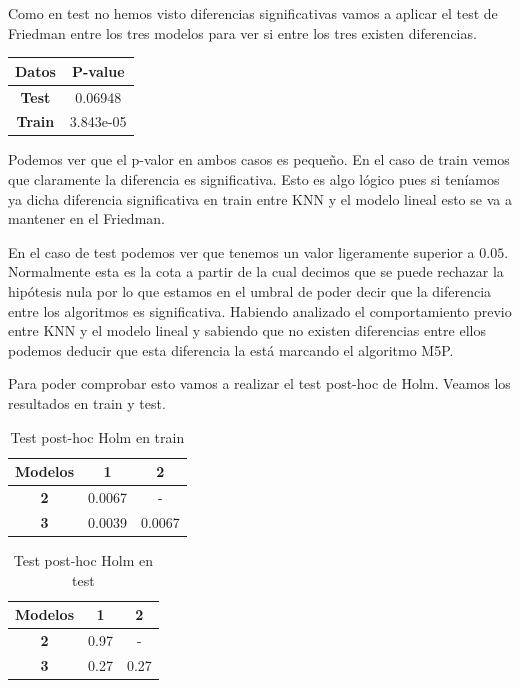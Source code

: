 \documentclass[12pt,a4paper]{article}
\begin{document}
Como en test no hemos visto diferencias significativas vamos a aplicar el test de Friedman entre los tres modelos para ver si entre los tres existen diferencias.

\begin{table}[H]
	\centering
	\begin{tabular}{|c|c|}
		\hline
		\textbf{Datos} & \textbf{P-value} \\ \hline
		\textbf{Test}  & 0.06948          \\ \hline
		\textbf{Train} & 3.843e-05        \\ \hline
	\end{tabular}
\end{table}

Podemos ver que el p-valor en ambos casos es pequeño. En el caso de train vemos que claramente la diferencia es significativa. Esto es algo lógico pues si teníamos ya dicha diferencia significativa en train entre KNN y el modelo lineal esto se va a mantener en el Friedman.

En el caso de test podemos ver que tenemos un valor ligeramente superior a $0.05$. Normalmente esta es la cota a partir de la cual decimos que se puede rechazar la hipótesis nula por lo que estamos en el umbral de poder decir que la diferencia entre los algoritmos es significativa. Habiendo analizado el comportamiento previo entre KNN y el modelo lineal y sabiendo que no existen diferencias entre ellos podemos deducir que esta diferencia la está marcando el algoritmo M5P.

Para poder comprobar esto vamos a realizar el test post-hoc de Holm. Veamos los resultados en train y test.

\begin{table}[H]
	\centering
	\begin{tabular}{|c|c|c|}
		\hline
		\textbf{Modelos} & \textbf{1} & \textbf{2} \\ \hline
		\textbf{2}       & 0.0067     & -          \\ \hline
		\textbf{3}       & 0.0039     & 0.0067     \\ \hline
	\end{tabular}
	\caption{Test post-hoc Holm en train}
\end{table}

\begin{table}[H]
	\centering
	\begin{tabular}{|c|c|c|}
		\hline
		\textbf{Modelos} & \textbf{1} & \textbf{2} \\ \hline
		\textbf{2}       & 0.97     & -          \\ \hline
		\textbf{3}       & 0.27     & 0.27     \\ \hline
	\end{tabular}
	\caption{Test post-hoc Holm en test}
\end{table}
\end{document}
